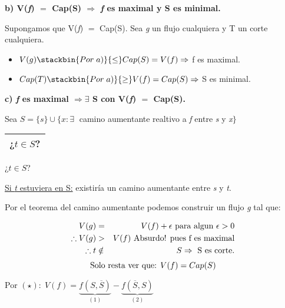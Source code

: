 \documentclass[12pt,a4paper]{report}
\begin{document}
			\textbf{b) V(\textit{f}) $=$ Cap(S) $\Rightarrow$ \textit{f} es maximal y S es minimal.}

				\vspace{2mm}
				\par Supongamos que V(\textit{f}) $=$ Cap(S). Sea \textit{g} un flujo cualquiera y T un corte cualquiera.
				\begin{itemize}
					\item $V(g) \stackbin{Por \; a)}{\leq} Cap(S) = V(f) \Rightarrow$ f es maximal.
					\item $Cap(T) \stackbin{Por \; a)}{\geq} V(f) = Cap(S) \Rightarrow$ S es minimal.
				\end{itemize}

			\vspace{5mm}
			\textbf{c) \textit{f} es maximal $\Rightarrow \exists$ S con V(\textit{f}) $=$ Cap(S).}

				\vspace{2mm}
				\par Sea $S = \{s\} \cup \{x : \exists \;$ camino aumentante realtivo a \textit{f} entre \textit{s} y \textit{x}$\}$

				\vspace{5mm}
				\begin{tabular}{|c|} \hline ¿$t \in S$? \\\hline \end{tabular}
				¿$t \in S$?

					\vspace{3mm}
					\underline{Si \textit{t} estuviera en S:} existiría un camino aumentante entre \textit{s} y \textit{t}.
					\par Por el teorema del camino aumentante podemos construir un flujo \textit{g} tal que:

					\begin{eqnarray}
						\nonumber V(g) &=& V(f) + \epsilon \textup{ para algun } \epsilon > 0 \\
						\nonumber \therefore V(g) &>& V(f) \textup{ Absurdo! pues f es maximal} \\
						\nonumber \therefore t &\notin & S \Rightarrow \textup{ S es corte.}
					\end{eqnarray}
					\[ \textup{Solo resta ver que: } V(f) = Cap(S) \]
					\par Por $(\star): \; V(f) =  \underbrace{f(S, \overline{S})}_{(1)} - \underbrace{f(\overline{S}, S)}_{(2)}$
\end{document}
